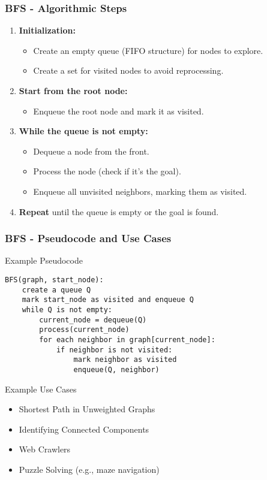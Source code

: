 \documentclass[aspectratio=169]{beamer}
\begin{document}
\begin{frame}[fragile]
    \frametitle{BFS - Algorithmic Steps}
    \begin{enumerate}
        \item \textbf{Initialization:}
        \begin{itemize}
            \item Create an empty queue (FIFO structure) for nodes to explore.
            \item Create a set for visited nodes to avoid reprocessing.
        \end{itemize}
        
        \item \textbf{Start from the root node:}
        \begin{itemize}
            \item Enqueue the root node and mark it as visited.
        \end{itemize}
        
        \item \textbf{While the queue is not empty:}
        \begin{itemize}
            \item Dequeue a node from the front.
            \item Process the node (check if it’s the goal).
            \item Enqueue all unvisited neighbors, marking them as visited.
        \end{itemize}
        
        \item \textbf{Repeat} until the queue is empty or the goal is found.
    \end{enumerate}
\end{frame}

\begin{frame}[fragile]
    \frametitle{BFS - Pseudocode and Use Cases}
    \begin{block}{Example Pseudocode}
        \begin{lstlisting}
BFS(graph, start_node):
    create a queue Q
    mark start_node as visited and enqueue Q
    while Q is not empty:
        current_node = dequeue(Q)
        process(current_node)
        for each neighbor in graph[current_node]:
            if neighbor is not visited:
                mark neighbor as visited
                enqueue(Q, neighbor)
        \end{lstlisting}
    \end{block}

    \begin{block}{Example Use Cases}
        \begin{itemize}
            \item Shortest Path in Unweighted Graphs
            \item Identifying Connected Components
            \item Web Crawlers
            \item Puzzle Solving (e.g., maze navigation)
        \end{itemize}
    \end{block}
\end{frame}
\end{document}
